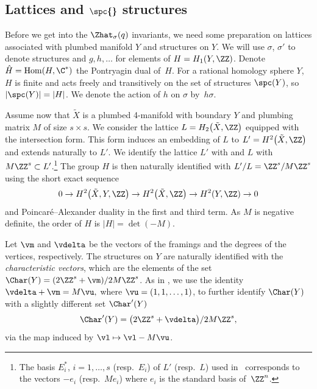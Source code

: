 \documentclass[pdftex]{sigma}
\begin{document}
\subsection[Lattices and spinc structures]{Lattices and $\boldsymbol{\spc{}}$ structures}\label{spc_structures}

Before we get into the $\Zhat_{\sigma} (q)$ invariants, we need some preparation on lattices associated with plumbed manifold $Y$ and \spc{} structures on $Y$. We will use $\sigma$, $\sigma'$ to denote \spc{} structures and $g, h, \dots$ for elements of $H = H_1(Y, \ZZ)$. Denote $\hat{H} = \operatorname{Hom}(H, \C^*)$ the Pontryagin dual of~$H$. For a rational homology sphere $Y$, $H$ is finite and acts freely and transitively on the set of \spc{} structures $\spc(Y)$, so $|\spc(Y)| = |H|$. We denote the action of $h$ on $\sigma$ by~$h\sigma$.

Assume now that $\tilde{X}$ is a plumbed 4-manifold with boundary $Y$ and plumbing matrix $M$ of size $s \times s$. We consider the lattice $L = H_2\bigl(\tilde{X}, \ZZ\bigr)$ equipped with the intersection form. This form induces an embedding of $L$ to $L' = H^2\bigl(\tilde{X}, \ZZ\bigr)$ and extends naturally to $L'$. We identify the lattice $L'$ with  and $L$ with $M\ZZ^s \subset L'$.\footnote{The basis $E^*_i$, $i = 1, \dots, s$ (resp.\ $E_i$) of $L'$ (resp.\ $L$) used in~\cite{Nem22} corresponds to the vectors $-e_i$ (resp.\ $M e_i$) where $e_i$ is the standard basis of~$\ZZ^n$.}
%
The group $H$ is then naturally identified with $L'/L = \ZZ^s/M \ZZ^s$ using the short exact sequence
\[
	0 \rightarrow H^2\bigl(\tilde{X}, Y, \ZZ\bigr) \rightarrow H^2\bigl(\tilde{X}, \ZZ\bigr) \rightarrow H^2(Y, \ZZ) \rightarrow 0
\]
and Poincar\'e--Alexander duality in the first and third term. As $M$ is negative definite, the order of $H$ is $|H|=\det(-M)$.

Let $\vm$ and $\vdelta$ be the vectors of the framings and the degrees of the vertices, respectively. The \spc{} structures on $Y$ are naturally identified with the \emph{characteristic vectors}, which are the elements of the set
$\Char(Y) = (2\ZZ^s+\vm)/2M\ZZ^s$.
As in \cite{GM21}, we use the identity $\vdelta + \vm = M\vu,$ where $\vu = (1, 1, \dots, 1)$,
to further identify $\Char(Y)$ with a slightly different set $\Char'(Y)$
\begin{equation}\label{eq:char}
	\Char'(Y) = \bigl(2\ZZ^s+\vdelta\bigr)/2M\ZZ^s,
\end{equation}
via the map induced by $\vl \mapsto \vl - M\vu$.
\end{document}
